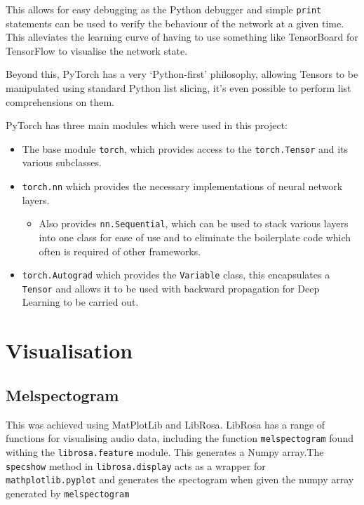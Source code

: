 \documentclass{l4proj}
\providecommand{\tightlist}{%
  \setlength{\itemsep}{0pt}\setlength{\parskip}{0pt}}
\begin{document}
This allows for easy debugging as the Python debugger and simple
\texttt{print} statements can be used to verify the behaviour of the
network at a given time. This alleviates the learning curve of having to
use something like TensorBoard for TensorFlow to visualise the network
state.

Beyond this, PyTorch has a very `Python-first' philosophy, allowing
Tensors to be manipulated using standard Python list slicing, it's even
possible to perform list comprehensions on them.

PyTorch has three main modules which were used in this project:

\begin{itemize}
\tightlist
\item
  The base module \texttt{torch}, which provides access to the
  \texttt{torch.Tensor} and its various subclasses.
\item
  \texttt{torch.nn} which provides the necessary implementations of
  neural network layers.

  \begin{itemize}
  \tightlist
  \item
    Also provides \texttt{nn.Sequential}, which can be used to stack
    various layers into one class for ease of use and to eliminate the
    boilerplate code which often is required of other frameworks.
  \end{itemize}
\item
  \texttt{torch.Autograd} which provides the \texttt{Variable} class,
  this encapsulates a \texttt{Tensor} and allows it to be used with
  backward propagation for Deep Learning to be carried out.
\end{itemize}

\section{Visualisation}\label{visualisation}

\subsection{Melspectogram}\label{melspectogram}

This was achieved using MatPlotLib and LibRosa. LibRosa has a range of
functions for visualising audio data, including the function
\texttt{melspectogram} found withing the \texttt{librosa.feature}
module. This generates a Numpy array.The \texttt{specshow} method in
\texttt{librosa.display} acts as a wrapper for
\texttt{mathplotlib.pyplot} and generates the spectogram when given the
numpy array generated by \texttt{melspectogram}
\end{document}
